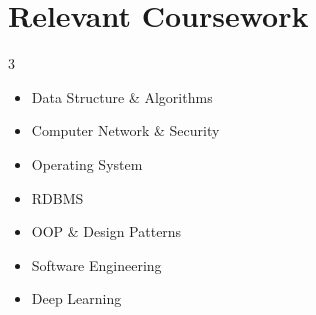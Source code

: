 \documentclass[letterpaper,11pt]{article}
\newcommand{\resumeSubHeadingListStart}{\begin{itemize}[leftmargin=0.0in, label={}]}
\newcommand{\resumeSubHeadingListEnd}{\end{itemize}}
\begin{document}
\section{Relevant Coursework}
\begin{multicols}{3}
	\begin{itemize}[itemsep=-5pt, parsep=3pt]
		\item\small Data Structure \& Algorithms
		\item Computer Network \& Security
		\item Operating System
		\item RDBMS
		\item OOP \& Design Patterns
		\item Software Engineering
		\item Deep Learning
	\end{itemize}
\end{multicols}
\vspace*{2.0\multicolsep}
\end{document}
